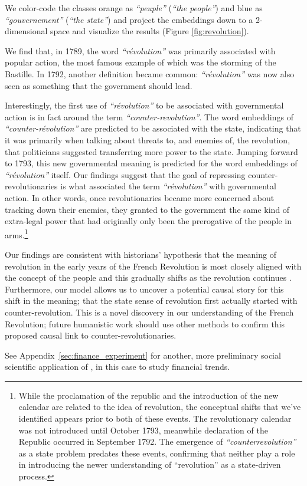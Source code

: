 We color-code the classes orange as \textit{``peuple'' } (\textit{``the people''}) and blue as \textit{``gouvernement''} (\textit{``the state''}) and project the embeddings down to a 2-dimensional space and visualize the results (Figure \ref{fig:revolution}).

We find that, in 1789, the word \textit{``révolution''} was primarily associated with popular action, the most famous example of which was the storming of the Bastille. In 1792, another definition became common: \textit{``révolution''} was now also seen as something that the government should lead. 

Interestingly, the first use of \textit{``révolution''} to be associated with governmental action is in fact around the term \textit{``counter-revolution''}. The word embeddings of \textit{``counter-révolution''} are predicted to be associated with the state, indicating that it was primarily when talking about threats to, and enemies of, the revolution, that politicians suggested transferring more power to the state. Jumping forward to 1793, this new governmental meaning is predicted for the word embeddings of \textit{``révolution''} itself. Our findings suggest that the goal of repressing counter-revolutionaries is what associated the term \textit{``révolution''} with governmental action. In other words, once revolutionaries became more concerned about tracking down their enemies, they granted to the government the same kind of extra-legal power that had originally only been the prerogative of the people in arms.\footnote{While the proclamation of the republic and the introduction of the new calendar are related to the idea of revolution, the conceptual shifts that we've identified appears prior to both of these events. The revolutionary calendar was not introduced until October 1793, meanwhile declaration of the Republic occurred in September 1792. The emergence of \textit{``counterrevolution''} as a state problem predates these events, confirming that neither play a role in introducing the newer understanding of ``revolution'' as a state-driven process.}

Our findings are consistent with historians' hypothesis that the meaning of revolution in the early years of the French Revolution is most closely aligned with the concept of the people and this gradually shifts as the revolution continues \cite{sewell2005logics,edelstein2012we}. Furthermore, our model allows us to uncover a potential causal story for this shift in the meaning; that the state sense of revolution first actually started with counter-revolution. This is a novel discovery in our understanding of the French Revolution; future humanistic work should use other methods to confirm this proposed causal link to counter-revolutionaries.

 See  Appendix~\ref{sec:finance_experiment} for another, more preliminary  social scientific application of \wc, in this case to study financial trends.  